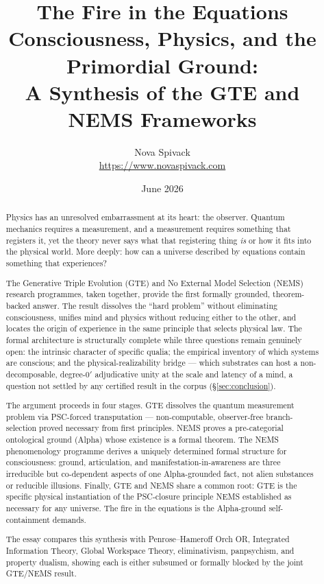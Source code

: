 \documentclass[11pt]{article}
\title{%
  \textbf{The Fire in the Equations}\\[0.6em]
  \large Consciousness, Physics, and the Primordial Ground:\\
  A Synthesis of the GTE and NEMS Frameworks
}
\author{Nova Spivack\\\normalsize \url{https://www.novaspivack.com}}
\date{June 2026}
\theoremstyle{remark}
\begin{document}
\maketitle
\NovaZenodoAfterTitle

\begin{abstract}
\raggedright
Physics has an unresolved embarrassment at its heart: the observer. Quantum mechanics
requires a measurement, and a measurement requires something that registers it, yet
the theory never says what that registering thing \emph{is} or how it fits into the
physical world. More deeply: how can a universe described by equations contain
something that experiences?

The Generative Triple Evolution (GTE) and No External Model Selection (NEMS) research
programmes, taken together, provide the first formally grounded, theorem-backed answer.
The result dissolves the ``hard problem'' without eliminating consciousness, unifies
mind and physics without reducing either to the other, and locates the origin of
experience in the same principle that selects physical law. The formal architecture is
structurally complete while three questions remain genuinely open: the intrinsic
character of specific qualia; the empirical inventory of which systems are conscious;
and the physical-realizability bridge --- which substrates can host a non-decomposable,
degree-$0'$ adjudicative unity at the scale and latency of a mind, a question not
settled by any certified result in the corpus (\S\ref{sec:conclusion}).

The argument proceeds in four stages. GTE dissolves the quantum measurement problem
via PSC-forced transputation --- non-computable, observer-free branch-selection proved
necessary from first principles. NEMS proves a pre-categorial ontological ground
(Alpha) whose existence is a formal theorem. The NEMS phenomenology programme derives
a uniquely determined formal structure for consciousness: ground, articulation, and
manifestation-in-awareness are three irreducible but co-dependent aspects of one
Alpha-grounded fact, not alien substances or reducible illusions. Finally, GTE and
NEMS share a common root: GTE is the specific physical instantiation of the
PSC-closure principle NEMS established as necessary for any universe. The fire in the
equations is the Alpha-ground self-containment demands.

The essay compares this synthesis with Penrose--Hameroff Orch OR, Integrated
Information Theory, Global Workspace Theory, eliminativism, panpsychism, and property
dualism, showing each is either subsumed or formally blocked by the joint GTE/NEMS
result.
\end{abstract}
\end{document}
